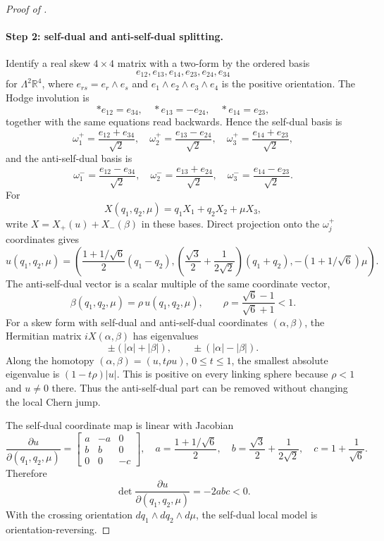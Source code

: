 \documentclass[11pt]{article}
\numberwithin{equation}{section}
\theoremstyle{definition}
\theoremstyle{remark}
\begin{document}
\begin{proof}[Proof of ]
\paragraph{Step 2: self-dual and anti-self-dual splitting.}
Identify a real skew \(4\times4\) matrix with a two-form by the ordered basis
\[
e_{12},e_{13},e_{14},e_{23},e_{24},e_{34}
\]
for \(\Lambda^2\mathbb R^4\), where \(e_{rs}=e_r\wedge e_s\) and
\(e_1\wedge e_2\wedge e_3\wedge e_4\) is the positive orientation. The Hodge involution is
\[
*e_{12}=e_{34},\quad *e_{13}=-e_{24},\quad *e_{14}=e_{23},
\]
together with the same equations read backwards. Hence the self-dual basis is
\[
\omega_1^+=\frac{e_{12}+e_{34}}{\sqrt2},\quad
\omega_2^+=\frac{e_{13}-e_{24}}{\sqrt2},\quad
\omega_3^+=\frac{e_{14}+e_{23}}{\sqrt2},
\]
and the anti-self-dual basis is
\[
\omega_1^-=\frac{e_{12}-e_{34}}{\sqrt2},\quad
\omega_2^-=\frac{e_{13}+e_{24}}{\sqrt2},\quad
\omega_3^-=\frac{e_{14}-e_{23}}{\sqrt2}.
\]
For
\[
X(q_1,q_2,\mu)=q_1X_1+q_2X_2+\mu X_3,
\]
write \(X=X_+(u)+X_-(\beta)\) in these bases. Direct projection onto the \(\omega_j^+\) coordinates
gives
\[
u(q_1,q_2,\mu)=
\left(
\frac{1+1/\sqrt6}{2}(q_1-q_2),
\left(\frac{\sqrt3}{2}+\frac{1}{2\sqrt2}\right)(q_1+q_2),
-(1+1/\sqrt6)\mu
\right).
\]
The anti-self-dual vector is a scalar multiple of the same coordinate vector,
\[
\beta(q_1,q_2,\mu)=\rho\,u(q_1,q_2,\mu),\qquad
\rho=\frac{\sqrt6-1}{\sqrt6+1}<1.
\]
For a skew form with self-dual and anti-self-dual coordinates \((\alpha,\beta)\), the Hermitian
matrix \(iX(\alpha,\beta)\) has eigenvalues
\[
\pm(|\alpha|+|\beta|),\qquad \pm(|\alpha|-|\beta|).
\]
Along the homotopy \((\alpha,\beta)=(u,t\rho u)\), \(0\le t\le1\), the smallest absolute eigenvalue
is \((1-t\rho)|u|\). This is positive on every linking sphere because \(\rho<1\) and
\(u\ne0\) there. Thus the anti-self-dual part can be removed without changing the local Chern
jump.

The self-dual coordinate map is linear with Jacobian
\[
\frac{\partial u}{\partial(q_1,q_2,\mu)}=
\begin{bmatrix}
a&-a&0\\ b&b&0\\0&0&-c
\end{bmatrix},
\quad
a=\frac{1+1/\sqrt6}{2},\quad
b=\frac{\sqrt3}{2}+\frac{1}{2\sqrt2},\quad
c=1+\frac1{\sqrt6}.
\]
Therefore
\[
\det\frac{\partial u}{\partial(q_1,q_2,\mu)}=-2abc<0.
\]
With the crossing orientation \(dq_1\wedge dq_2\wedge d\mu\), the self-dual local model is
orientation-reversing.


\end{proof}
\end{document}
